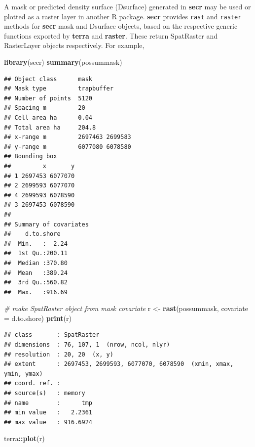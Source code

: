 \documentclass[
]{book}
\newenvironment{Shaded}{\begin{snugshade}}{\end{snugshade}}
\newcommand{\AttributeTok}[1]{\textcolor[rgb]{0.13,0.29,0.53}{#1}}
\newcommand{\CommentTok}[1]{\textcolor[rgb]{0.56,0.35,0.01}{\textit{#1}}}
\newcommand{\FunctionTok}[1]{\textcolor[rgb]{0.13,0.29,0.53}{\textbf{#1}}}
\newcommand{\NormalTok}[1]{#1}
\newcommand{\OtherTok}[1]{\textcolor[rgb]{0.56,0.35,0.01}{#1}}
\newcommand{\SpecialCharTok}[1]{\textcolor[rgb]{0.81,0.36,0.00}{\textbf{#1}}}
\newcommand{\StringTok}[1]{\textcolor[rgb]{0.31,0.60,0.02}{#1}}
\begin{document}
A mask or predicted density surface (Dsurface) generated in \textbf{secr} may be used or plotted as a raster layer in another R package. \textbf{secr} provides \texttt{rast} and \texttt{raster} methods for \textbf{secr} mask and Dsurface objects, based on the respective generic functions exported by \textbf{terra} and \textbf{raster}. These return SpatRaster and RasterLayer objects respectively. For example,

\begin{Shaded}
\begin{Highlighting}[]
\FunctionTok{library}\NormalTok{(secr)}
\FunctionTok{summary}\NormalTok{(possummask)}
\end{Highlighting}
\end{Shaded}

\begin{verbatim}
## Object class      mask 
## Mask type         trapbuffer 
## Number of points  5120 
## Spacing m         20 
## Cell area ha      0.04 
## Total area ha     204.8 
## x-range m         2697463 2699583 
## y-range m         6077080 6078580 
## Bounding box      
##         x       y
## 1 2697453 6077070
## 2 2699593 6077070
## 4 2699593 6078590
## 3 2697453 6078590
## 
## Summary of covariates 
##    d.to.shore    
##  Min.   :  2.24  
##  1st Qu.:200.11  
##  Median :370.80  
##  Mean   :389.24  
##  3rd Qu.:560.82  
##  Max.   :916.69
\end{verbatim}

\begin{Shaded}
\begin{Highlighting}[]
\CommentTok{\# make SpatRaster object from mask covariate}
\NormalTok{r }\OtherTok{\textless{}{-}} \FunctionTok{rast}\NormalTok{(possummask, }\AttributeTok{covariate =} \StringTok{\textquotesingle{}d.to.shore\textquotesingle{}}\NormalTok{)}
\FunctionTok{print}\NormalTok{(r)}
\end{Highlighting}
\end{Shaded}

\begin{verbatim}
## class       : SpatRaster 
## dimensions  : 76, 107, 1  (nrow, ncol, nlyr)
## resolution  : 20, 20  (x, y)
## extent      : 2697453, 2699593, 6077070, 6078590  (xmin, xmax, ymin, ymax)
## coord. ref. :  
## source(s)   : memory
## name        :      tmp 
## min value   :   2.2361 
## max value   : 916.6924
\end{verbatim}

\begin{Shaded}
\begin{Highlighting}[]
\NormalTok{terra}\SpecialCharTok{::}\FunctionTok{plot}\NormalTok{(r)}
\end{Highlighting}
\end{Shaded}
\end{document}

